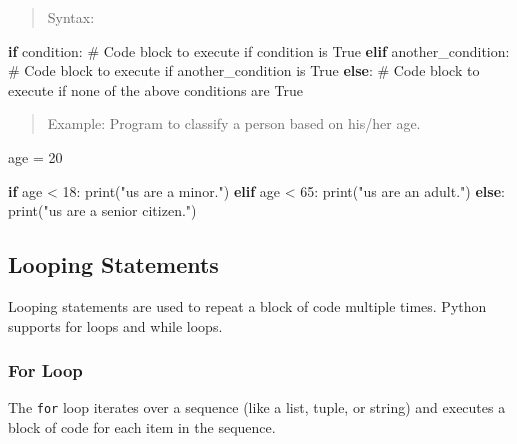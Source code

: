 \documentclass[
  letterpaper,
  DIV=11,
  numbers=noendperiod]{scrreprt}
\newenvironment{Shaded}{\begin{snugshade}}{\end{snugshade}}
\newcommand{\BuiltInTok}[1]{\textcolor[rgb]{0.00,0.23,0.31}{#1}}
\newcommand{\CommentTok}[1]{\textcolor[rgb]{0.37,0.37,0.37}{#1}}
\newcommand{\ControlFlowTok}[1]{\textcolor[rgb]{0.00,0.23,0.31}{\textbf{#1}}}
\newcommand{\DecValTok}[1]{\textcolor[rgb]{0.68,0.00,0.00}{#1}}
\newcommand{\NormalTok}[1]{\textcolor[rgb]{0.00,0.23,0.31}{#1}}
\newcommand{\OperatorTok}[1]{\textcolor[rgb]{0.37,0.37,0.37}{#1}}
\newcommand{\StringTok}[1]{\textcolor[rgb]{0.13,0.47,0.30}{#1}}
\theoremstyle{plain}
\theoremstyle{definition}
\theoremstyle{remark}
\begin{document}
\begin{quote}
Syntax:
\end{quote}

\begin{Shaded}
\begin{Highlighting}[]
\ControlFlowTok{if}\NormalTok{ condition:}
    \CommentTok{\# Code block to execute if condition is True}
\ControlFlowTok{elif}\NormalTok{ another\_condition:}
    \CommentTok{\# Code block to execute if another\_condition is True}
\ControlFlowTok{else}\NormalTok{:}
    \CommentTok{\# Code block to execute if none of the above conditions are True}
\end{Highlighting}
\end{Shaded}

\begin{quote}
Example: Program to classify a person based on his/her age.
\end{quote}

\begin{Shaded}
\begin{Highlighting}[]
\NormalTok{age }\OperatorTok{=} \DecValTok{20}

\ControlFlowTok{if}\NormalTok{ age }\OperatorTok{\textless{}} \DecValTok{18}\NormalTok{:}
    \BuiltInTok{print}\NormalTok{(}\StringTok{"us are a minor."}\NormalTok{)}
\ControlFlowTok{elif}\NormalTok{ age }\OperatorTok{\textless{}} \DecValTok{65}\NormalTok{:}
    \BuiltInTok{print}\NormalTok{(}\StringTok{"us are an adult."}\NormalTok{)}
\ControlFlowTok{else}\NormalTok{:}
    \BuiltInTok{print}\NormalTok{(}\StringTok{"us are a senior citizen."}\NormalTok{)}
\end{Highlighting}
\end{Shaded}

\subsection{Looping Statements}\label{looping-statements}

Looping statements are used to repeat a block of code multiple times.
Python supports for loops and while loops.

\subsubsection{For Loop}\label{for-loop}

The \texttt{for} loop iterates over a sequence (like a list, tuple, or
string) and executes a block of code for each item in the sequence.
\end{document}
